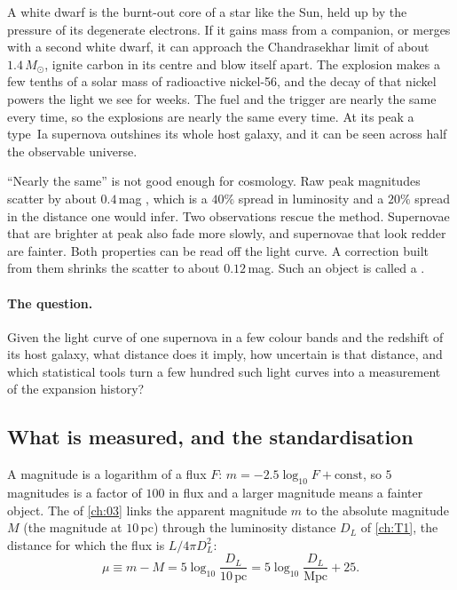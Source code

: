 A white dwarf is the burnt-out core of a star like the Sun, held up by the pressure of its degenerate electrons. If it gains mass from a companion, or merges with a second white dwarf, it can approach the Chandrasekhar limit of about $1.4\,M_\odot$, ignite carbon in its centre and blow itself apart. The explosion makes a few tenths of a solar mass of radioactive nickel-56, and the decay of that nickel powers the light we see for weeks. The fuel and the trigger are nearly the same every time, so the explosions are nearly the same every time. At its peak a type~Ia supernova outshines its whole host galaxy, and it can be seen across half the observable universe.

``Nearly the same'' is not good enough for cosmology. Raw peak magnitudes scatter by about $0.4$\,mag \cite[p.~33]{Weinberg2013}, which is a $40\%$ spread in luminosity and a $20\%$ spread in the distance one would infer. Two observations rescue the method. Supernovae that are brighter at peak also fade more slowly, and supernovae that look redder are fainter. Both properties can be read off the light curve. A correction built from them shrinks the scatter to about $0.12$\,mag. Such an object is called a  .

\paragraph{The question.} Given the light curve of one supernova in a few colour bands and the redshift of its host galaxy, what distance does it imply, how uncertain is that distance, and which statistical tools turn a few hundred such light curves into a measurement of the expansion history?

\subsection{What is measured, and the standardisation}

A magnitude is a logarithm of a flux $F$: $m=-2.5\log_{10}F+\text{const}$, so $5$ magnitudes is a factor of $100$ in flux and a larger magnitude means a fainter object. The  of \cref{ch:03} links the apparent magnitude $m$ to the absolute magnitude $M$ (the magnitude at $10$\,pc) through the luminosity distance $D_L$ of \cref{ch:T1}, the distance for which the flux is $L/4\pi D_L^2$:
\begin{equation}
  \mu\equiv m-M=5\log_{10}\frac{D_L}{10\,\mathrm{pc}}=5\log_{10}\frac{D_L}{\mathrm{Mpc}}+25 .
  \label{T2b:eq:mu}
\end{equation}

